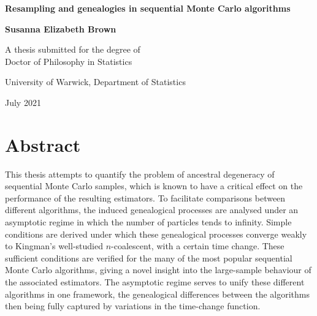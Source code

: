 \documentclass[oneside]{scrbook} %
\theoremstyle{definition}
\newcommand{\1}[1]{\mathbbm{1}_{#1}} %
\begin{document}
\begin{titlepage}
\centering
\vspace*{5cm}
\begin{LARGE}\bfseries
Resampling and genealogies in sequential Monte Carlo algorithms\par \end{LARGE} 
\vspace{1.5cm} 
\begin{Large}\bfseries
Susanna Elizabeth Brown\par
\end{Large}
\vspace{3cm}
\begin{large}
A thesis submitted for the degree of\\Doctor of Philosophy in Statistics \par
\vspace{1.5cm}
University of Warwick, Department of Statistics \par
\vspace{1.5cm}
July 2021 %
\end{large}
\end{titlepage}


\frontmatter


\chapter*{Abstract}
This thesis attempts to quantify the problem of ancestral degeneracy of sequential Monte Carlo samples, which is known to  have a critical effect on the performance of the resulting estimators.
To facilitate comparisons between different algorithms, the induced genealogical processes are analysed under an asymptotic regime in which the number of particles tends to infinity. 
Simple conditions are derived under which these genealogical processes converge weakly to Kingman's well-studied $n$-coalescent, with a certain time change.
These sufficient conditions are verified for the many of the most popular sequential Monte Carlo algorithms, giving a novel insight into the large-sample behaviour of the associated estimators.
The asymptotic regime serves to unify these different algorithms in one framework, the genealogical differences between the algorithms then being fully captured by variations in the time-change function.


\end{document}
